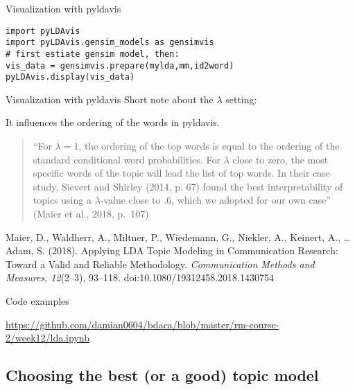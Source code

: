 \documentclass[compress]{beamer}
\begin{document}
\begin{frame}[fragile]{Visualization with pyldavis}
\begin{lstlisting}
import pyLDAvis
import pyLDAvis.gensim_models as gensimvis
# first estiate gensim model, then:
vis_data = gensimvis.prepare(mylda,mm,id2word)
pyLDAvis.display(vis_data)
\end{lstlisting}
\end{frame}

\begin{frame}{Visualization with pyldavis}
Short note about the $\lambda$ setting:

It influences the ordering of the words in pyldavis.

\begin{quote}
``For $\lambda = 1$, the ordering of the top words is equal to the ordering of the standard conditional word probabilities. For $\lambda$ close to zero, the most specific words of the topic will lead the list of top words. In their case study, Sievert and Shirley (2014, p. 67) found the best interpretability of topics using a  $\lambda$-value close to .6, which we adopted for our own case'' (Maier et al., 2018, p.~107)
\end{quote}


\tiny{Maier, D., Waldherr, A., Miltner, P., Wiedemann, G., Niekler, A., Keinert, A., \ldots Adam, S. (2018). Applying LDA Topic Modeling in Communication Research: Toward a Valid and Reliable Methodology. \textit{Communication Methods and Measures, 12}(2--3), 93--118. doi:10.1080/19312458.2018.1430754}
\end{frame}

\begin{frame}[plain]{Code examples}


\url{https://github.com/damian0604/bdaca/blob/master/rm-course-2/week12/lda.ipynb}
\end{frame}



\subsection{Choosing the best (or a good) topic model}
\end{document}
